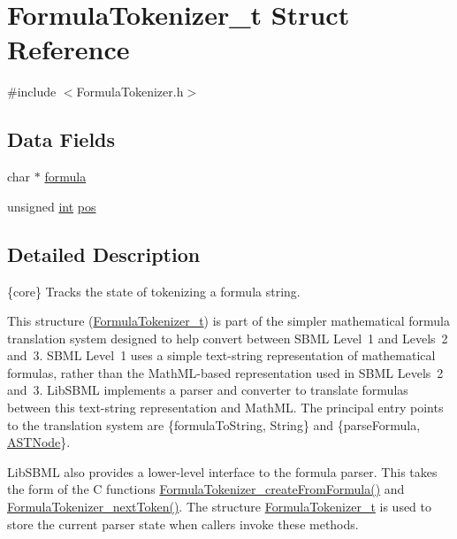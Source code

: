 \hypertarget{struct_formula_tokenizer__t}{}\section{Formula\+Tokenizer\+\_\+t Struct Reference}
\label{struct_formula_tokenizer__t}


{\ttfamily \#include $<$Formula\+Tokenizer.\+h$>$}

\subsection*{Data Fields}
\begin{DoxyCompactItemize}
\item 
char $\ast$ \hyperlink{struct_formula_tokenizer__t_afaa9d07f8beb33c3ca95257cdaf143a2}{formula}
\item 
unsigned \hyperlink{lp__lib_8h_adeb9ec6400320e4923ac9d836d509ddb}{int} \hyperlink{struct_formula_tokenizer__t_aafb61b7f290b097afdc29c4ae707431b}{pos}
\end{DoxyCompactItemize}


\subsection{Detailed Description}
\{core\} Tracks the state of tokenizing a formula string.

This structure (\hyperlink{struct_formula_tokenizer__t}{Formula\+Tokenizer\+\_\+t}) is part of the simpler mathematical formula translation system designed to help convert between S\+B\+ML Level~1 and Levels~2 and~3. S\+B\+ML Level~1 uses a simple text-\/string representation of mathematical formulas, rather than the Math\+M\+L-\/based representation used in S\+B\+ML Levels~2 and~3. Lib\+S\+B\+ML implements a parser and converter to translate formulas between this text-\/string representation and Math\+ML. The principal entry points to the translation system are \{formula\+To\+String, String\} and \{parse\+Formula, \hyperlink{class_a_s_t_node}{A\+S\+T\+Node}\}.

Lib\+S\+B\+ML also provides a lower-\/level interface to the formula parser. This takes the form of the C functions \hyperlink{_formula_tokenizer_8h_ad07a94049062cb4d9d6f76231da447a5}{Formula\+Tokenizer\+\_\+create\+From\+Formula()} and \hyperlink{_formula_tokenizer_8h_a85f75f0f003ba89ae22163cef7dacb1d}{Formula\+Tokenizer\+\_\+next\+Token()}. The structure \hyperlink{struct_formula_tokenizer__t}{Formula\+Tokenizer\+\_\+t} is used to store the current parser state when callers invoke these methods.

